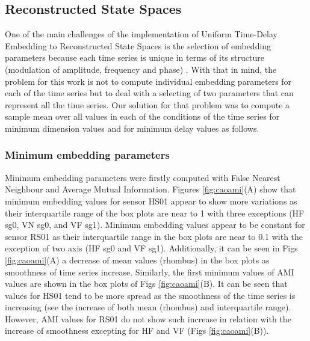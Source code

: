 \documentclass[fleqn,10pt]{wlscirep}
\begin{document}
\subsection*{Reconstructed State Spaces}
One of the main challenges of the implementation of 
Uniform Time-Delay Embedding to Reconstructed State Spaces is the 
selection of embedding parameters because each time series is unique in 
terms of its structure (modulation of amplitude, frequency and phase) 
\cite{ frank2010, sama2013, bradley2015}.
With that in mind, the problem for this work is not to compute individual 
embedding parameters for each of the time series but to deal with a 
selecting of two parameters that can represent all the time series. 
Our solution for that problem was to compute a sample mean over all 
values in each of the conditions of the time series 
for minimum dimension values and 
for minimum delay values as follows.

\subsubsection*{Minimum embedding parameters}
Minimum embedding parameters were firstly computed 
with False Nearest Neighbour and Average Mutual Information.
Figures \ref{fig:caoami}(A) show that minimum embedding values 
for sensor HS01 appear to show more variations as their 
interquartile range of the box plots are near to 1 
with three exceptions (HF sg0, VN sg0, and VF sg1).
Minimum embedding values appear to be constant for sensor RS01 
as their interquartile range 
in the box plots are near to 0.1 with the exception of 
two axis (HF sg0 and VF sg1).
Additionally, it can be seen in Figs \ref{fig:caoami}(A) a 
decrease of mean values (rhombus) in the box plots
as smoothness of time series increase.
Similarly, the first minimum values of AMI values are 
shown in the box plots of Figs \ref{fig:caoami}(B).
It can be seen that values for HS01 tend to be more spread as the smoothness 
of the time series is increasing 
(see the increase of both mean (rhombus) and interquartile range).
However, AMI values for RS01 do not show such increase in relation with
the increase of smoothness excepting for HF and VF
(Figs \ref{fig:caoami}(B)).
\end{document}
